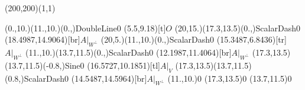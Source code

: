 \unitlength=1bp%

\begin{feynartspicture}(200,200)(1,1)

\FADiagram{}
\FAProp(0.,10.)(11.,10.)(0.,){DoubleLine}{0}
\FALabel(5.5,9.18)[t]{$O$}
\FAProp(20,15.)(17.3,13.5)(0.,){ScalarDash}{0}
\FALabel(18.4987,14.9064)[br]{$A|_{W^\perp}$}
\FAProp(20,5.)(11.,10.)(0.,){ScalarDash}{0}
\FALabel(15.3487,6.8436)[tr]{$A|_{W^\perp}$}
\FAProp(11.,10.)(13.7,11.5)(0.,){ScalarDash}{0}
\FALabel(12.1987,11.4064)[br]{$A|_{W^\perp}$}
\FAProp(17.3,13.5)(13.7,11.5)(-0.8,){Sine}{0}
\FALabel(16.5727,10.1851)[tl]{$A|_V$}
\FAProp(17.3,13.5)(13.7,11.5)(0.8,){ScalarDash}{0}
\FALabel(14.5487,14.5964)[br]{$A|_{W^\perp}$}
\FAVert(11.,10.){0}
\FAVert(17.3,13.5){0}
\FAVert(13.7,11.5){0}
\end{feynartspicture}

